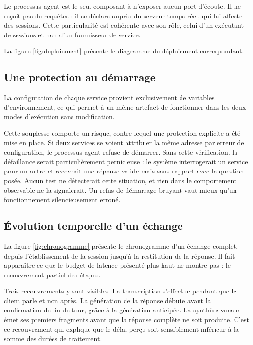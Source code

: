 Le processus agent est le seul composant à n'exposer aucun port d'écoute. Il ne reçoit pas de requêtes : il se déclare auprès du serveur temps réel, qui lui affecte des sessions. Cette particularité est cohérente avec son rôle, celui d'un exécutant de sessions et non d'un fournisseur de service.

La figure \ref{fig:deploiement} présente le diagramme de déploiement correspondant.


\subsection{Une protection au démarrage}

La configuration de chaque service provient exclusivement de variables d'environnement, ce qui permet à un même artefact de fonctionner dans les deux modes d'exécution sans modification.

Cette souplesse comporte un risque, contre lequel une protection explicite a été mise en place. Si deux services se voient attribuer la même adresse par erreur de configuration, le processus agent refuse de démarrer. Sans cette vérification, la défaillance serait particulièrement pernicieuse : le système interrogerait un service pour un autre et recevrait une réponse valide mais sans rapport avec la question posée. Aucun test ne détecterait cette situation, et rien dans le comportement observable ne la signalerait. Un refus de démarrage bruyant vaut mieux qu'un fonctionnement silencieusement erroné.

\subsection{Évolution temporelle d'un échange}

La figure \ref{fig:chronogramme} présente le chronogramme d'un échange complet, depuis l'établissement de la session jusqu'à la restitution de la réponse. Il fait apparaître ce que le budget de latence présenté plus haut ne montre pas : le recouvrement partiel des étapes.

Trois recouvrements y sont visibles. La transcription s'effectue pendant que le client parle et non après. La génération de la réponse débute avant la confirmation de fin de tour, grâce à la génération anticipée. La synthèse vocale émet ses premiers fragments avant que la réponse complète ne soit produite. C'est ce recouvrement qui explique que le délai perçu soit sensiblement inférieur à la somme des durées de traitement.

